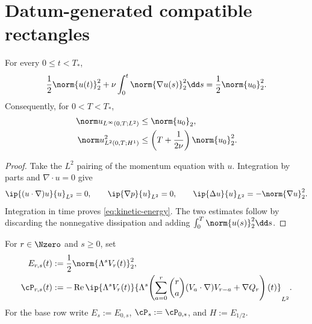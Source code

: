 \section{Datum-generated compatible rectangles}

\begin{proposition}
\label{prop:kinetic-energy}
For every \(0\le t<T_*\),
\begin{equation}
 \frac12\norm{u(t)}_2^2
 +\nu\int_0^t\norm{\nabla u(s)}_2^2\dd s
 =\frac12\norm{u_0}_2^2.
 \label{eq:kinetic-energy}
\end{equation}
Consequently, for \(0<T<T_*\),
\begin{align}
 \norm u_{L^\infty(0,T;L^2)}&\le\norm{u_0}_2,
 \label{eq:energy-Linf}\\
 \norm u_{L^2(0,T;H^1)}^2
 &\le\left(T+\frac1{2\nu}\right)\norm{u_0}_2^2.
 \label{eq:energy-L2H1}
\end{align}
\end{proposition}

\begin{proof}
Take the \(L^2\) pairing of the momentum equation with \(u\).  Integration
by parts and \(\nabla\cdot u=0\) give
\[
 \ip{(u\cdot\nabla)u}{u}_{L^2}=0,
 \qquad
 \ip{\nabla p}{u}_{L^2}=0,
 \qquad
 \ip{\Delta u}{u}_{L^2}=-\norm{\nabla u}_2^2.
\]
Integration in time proves \eqref{eq:kinetic-energy}.  The two estimates
follow by discarding the nonnegative dissipation and adding
\(\int_0^T\norm{u(s)}_2^2\dd s\).
\end{proof}

\begin{definition}
\label{def:critical-height-rows}
For \(r\in\Nzero\) and \(s\ge0\), set
\begin{align}
 E_{r,s}(t)&:=\frac12\norm{\Lambda^sV_r(t)}_2^2,
 \label{eq:temporal-row-spatial-energy}\\
 \cP_{r,s}(t)&:=-\operatorname{Re}
 \ip{\Lambda^sV_r(t)}
 {\Lambda^s\!\left(
   \sum_{a=0}^{r}\binom ra(V_a\cdot\nabla)V_{r-a}+\nabla Q_r
 \right)(t)}_{L^2}.
 \label{eq:temporal-row-pressure-complete-transfer}
\end{align}
For the base row write \(E_s:=E_{0,s}\), \(\cP_s:=\cP_{0,s}\), and
\(H:=E_{1/2}\).
\end{definition}

